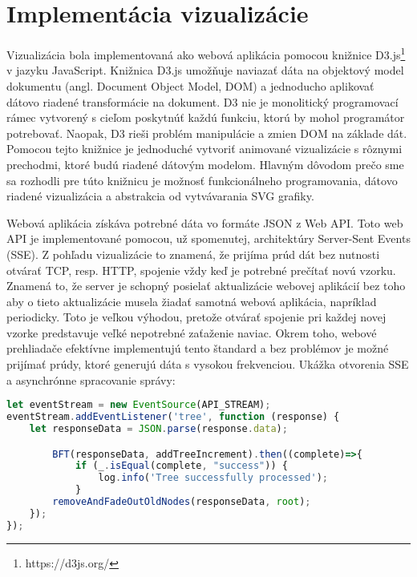 \section{Implementácia vizualizácie}
\label{Implementácia vizualizácie}
Vizualizácia bola implementovaná ako webová aplikácia pomocou knižnice D3.js\footnote{https://d3js.org/} v jazyku JavaScript. Knižnica D3.js umožňuje naviazať dáta na objektový model dokumentu (angl. Document Object Model, DOM) a jednoducho aplikovať dátovo riadené transformácie na dokument. D3 nie je monolitický programovací rámec vytvorený s cieľom poskytnúť každú funkciu, ktorú by mohol programátor potrebovať. Naopak, D3 rieši problém manipulácie a zmien DOM na základe dát. Pomocou tejto knižnice je jednoduché vytvoriť animované vizualizácie s rôznymi prechodmi, ktoré budú riadené dátovým modelom. Hlavným dôvodom prečo sme sa rozhodli pre túto knižnicu je možnosť funkcionálneho programovania, dátovo riadené vizualizácia a abstrakcia od vytvávarania SVG grafiky.
\par
Webová aplikácia získáva potrebné dáta vo formáte JSON z Web API. Toto web API je implementované pomocou, už spomenutej, architektúry Server-Sent Events (SSE). Z pohľadu vizualizácie to znamená, že prijíma prúd dát bez nutnosti otvárať TCP, resp. HTTP, spojenie vždy keď je potrebné prečítať novú vzorku. Znamená to, že server je schopný posielať aktualizácie webovej aplikácií bez toho aby o tieto aktualizácie musela žiadať samotná webová aplikácia, napríklad periodicky. Toto je veľkou výhodou, pretože otvárať spojenie pri každej novej vzorke predstavuje veľké nepotrebné zaťaženie naviac. Okrem toho, webové prehliadače efektívne implementujú tento štandard a bez problémov je možné prijímať prúdy, ktoré generujú dáta s vysokou frekvenciou. Ukážka otvorenia SSE a asynchrónne spracovanie správy:
\begin{lstlisting}[language=JavaScript]
let eventStream = new EventSource(API_STREAM);
eventStream.addEventListener('tree', function (response) {
    let responseData = JSON.parse(response.data);

        BFT(responseData, addTreeIncrement).then((complete)=>{
            if (_.isEqual(complete, "success")) {
                log.info('Tree successfully processed');
            }
        removeAndFadeOutOldNodes(responseData, root);
    });
});
\end{lstlisting}
